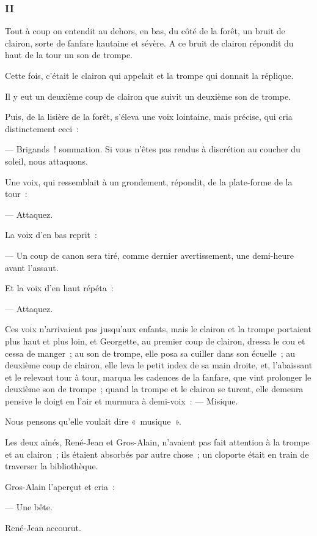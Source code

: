 \documentclass[french,twoside]{book} %
\begin{document}
\subsubsection[{II}]{II}
\label{p3l3c2}
\noindent Tout à coup on entendit au dehors, en bas, du côté de la forêt, un bruit de clairon, sorte de fanfare hautaine et sévère. A ce bruit de clairon répondit du haut de la tour un son de trompe.\par
Cette fois, c’était le clairon qui appelait et la trompe qui donnait la réplique.\par
Il y eut un deuxième coup de clairon que suivit un deuxième son de trompe.\par
Puis, de la lisière de la forêt, s’éleva une voix lointaine, mais précise, qui cria distinctement ceci :\par
— Brigands ! sommation. Si vous n’êtes pas rendus à discrétion au coucher du soleil, nous attaquons.\par
Une voix, qui ressemblait à un grondement, répondit, de la plate-forme de la tour :\par
— Attaquez.\par
La voix d’en bas reprit :\par
 — Un coup de canon sera tiré, comme dernier avertissement, une demi-heure avant l’assaut.\par
Et la voix d’en haut répéta :\par
— Attaquez.\par
Ces voix n’arrivaient pas jusqu’aux enfants, mais le clairon et la trompe portaient plus haut et plus loin, et Georgette, au premier coup de clairon, dressa le cou et cessa de manger ; au son de trompe, elle posa sa cuiller dans son écuelle ; au deuxième coup de clairon, elle leva le petit index de sa main droite, et, l’abaissant et le relevant tour à tour, marqua les cadences de la fanfare, que vint prolonger le deuxième son de trompe ; quand la trompe et le clairon se turent, elle demeura pensive le doigt en l’air et murmura à demi-voix : — Misique.\par
Nous pensons qu’elle voulait dire « musique ».\par
Les deux aînés, René-Jean et Gros-Alain, n’avaient pas fait attention à la trompe et au clairon ; ils étaient absorbés par autre chose ; un cloporte était en train de traverser la bibliothèque.\par
Gros-Alain l’aperçut et cria :\par
— Une bête.\par
René-Jean accourut.\par
\end{document}
